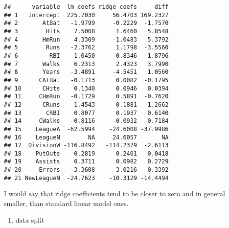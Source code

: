 \documentclass[
]{article}
\newenvironment{Shaded}{\begin{snugshade}}{\end{snugshade}}
\newcommand{\AttributeTok}[1]{\textcolor[rgb]{0.13,0.29,0.53}{#1}}
\newcommand{\CommentTok}[1]{\textcolor[rgb]{0.56,0.35,0.01}{\textit{#1}}}
\newcommand{\DecValTok}[1]{\textcolor[rgb]{0.00,0.00,0.81}{#1}}
\newcommand{\FloatTok}[1]{\textcolor[rgb]{0.00,0.00,0.81}{#1}}
\newcommand{\FunctionTok}[1]{\textcolor[rgb]{0.13,0.29,0.53}{\textbf{#1}}}
\newcommand{\NormalTok}[1]{#1}
\newcommand{\OtherTok}[1]{\textcolor[rgb]{0.56,0.35,0.01}{#1}}
\newcommand{\SpecialCharTok}[1]{\textcolor[rgb]{0.81,0.36,0.00}{\textbf{#1}}}
\providecommand{\tightlist}{%
  \setlength{\itemsep}{0pt}\setlength{\parskip}{0pt}}
\begin{document}
\begin{verbatim}
##      variable  lm_coefs ridge_coefs     diff
## 1   Intercept  225.7030     56.4703 169.2327
## 2       AtBat   -1.9799     -0.2229  -1.7570
## 3        Hits    7.5008      1.6460   5.8548
## 4       HmRun    4.3309     -1.0483   5.3792
## 5        Runs   -2.3762      1.1798  -3.5560
## 6         RBI   -1.0450      0.8346  -1.8796
## 7       Walks    6.2313      2.4323   3.7990
## 8       Years   -3.4891     -4.5451   1.0560
## 9      CAtBat   -0.1713      0.0082  -0.1795
## 10      CHits    0.1340      0.0946   0.0394
## 11     CHmRun   -0.1729      0.5891  -0.7620
## 12      CRuns    1.4543      0.1881   1.2662
## 13       CRBI    0.8077      0.1937   0.6140
## 14     CWalks   -0.8116     -0.0932  -0.7184
## 15    LeagueA  -62.5994    -24.6008 -37.9986
## 16    LeagueN        NA     24.6057       NA
## 17  DivisionW -116.8492   -114.2379  -2.6113
## 18    PutOuts    0.2819      0.2401   0.0418
## 19    Assists    0.3711      0.0982   0.2729
## 20     Errors   -3.3608     -3.0216  -0.3392
## 21 NewLeagueN  -24.7623    -10.3129 -14.4494
\end{verbatim}

I would say that ridge coefficients tend to be closer to zero and in
general smaller, than standard linear model ones.

\begin{enumerate}
\def\labelenumi{\alph{enumi}.}
\setcounter{enumi}{3}
\tightlist
\item
  data split
\end{enumerate}

\begin{Shaded}
\end{Shaded}
\end{document}
